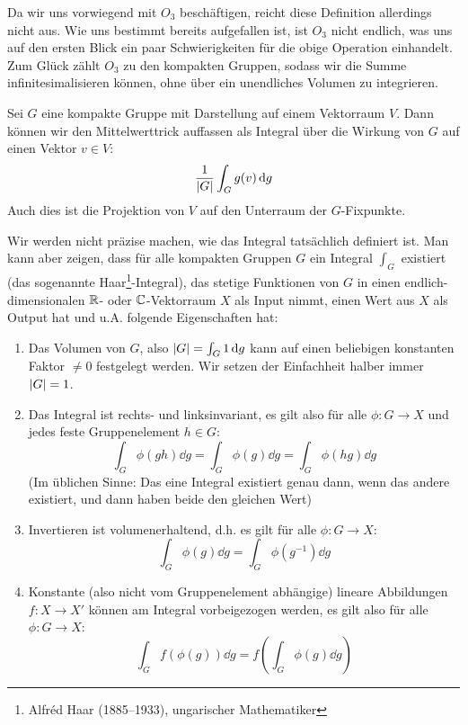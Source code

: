 \begin{remark}
Da wir uns vorwiegend mit $O_3$ beschäftigen, reicht diese Definition allerdings nicht aus. Wie uns bestimmt bereits aufgefallen ist, ist $O_3$ nicht endlich, was uns auf den ersten Blick ein paar Schwierigkeiten für die obige Operation einhandelt. Zum Glück zählt $O_3$ zu den kompakten Gruppen, sodass wir die Summe infinitesimalisieren können, ohne über ein unendliches Volumen zu integrieren.
\end{remark}

\begin{definition}
	Sei $G$ eine kompakte Gruppe mit Darstellung auf einem Vektorraum $V$. Dann können wir den Mittelwerttrick auffassen als Integral über die Wirkung von $G$ auf einen Vektor $v\in V$:
	\[
		\frac{1}{\lvert G\rvert} \int_{G} g(v) \,\textrm{d} g
	\]
	Auch dies ist die Projektion von $V$ auf den Unterraum der $G$-Fixpunkte.
	
	\medbreak
	Wir werden nicht präzise machen, wie das Integral tatsächlich definiert ist. Man kann aber zeigen, dass für alle kompakten Gruppen $G$ ein Integral $\int_G$ existiert (das sogenannte Haar\footnote{Alfréd Haar (1885--1933), ungarischer Mathematiker}-Integral), das stetige Funktionen von $G$ in einen endlich-dimensionalen $\mathbb{R}$- oder $\mathbb{C}$-Vektorraum $X$ als Input nimmt, einen Wert aus $X$ als Output hat und u.A. folgende Eigenschaften hat: 
	\begin{enumerate}
		\item Das Volumen von $G$, also $\lvert G\rvert = \int_G 1 \,\textrm{d} g$ kann auf einen beliebigen konstanten Faktor $\neq0$ festgelegt werden. Wir setzen der Einfachheit halber immer $\lvert G\rvert=1$.
		\item Das Integral ist rechts- und linksinvariant, es gilt also für alle $\phi: G\to X$ und jedes feste Gruppenelement $h\in G$:
		\[\int_{G} \phi(gh) \dd g = \int_{G} \phi(g) \dd g  = \int_{G} \phi(hg) \dd g\]
		(Im üblichen Sinne: Das eine Integral existiert genau dann, wenn das andere existiert, und dann haben beide den gleichen Wert)
		\item Invertieren ist volumenerhaltend, d.h. es gilt für alle $\phi: G\to X$:
		\[\int_G \phi(g) \dd g = \int_G \phi(g^{-1}) \dd g\]
		\item Konstante (also nicht vom Gruppenelement abhängige) lineare Abbildungen $f: X\to X'$ können am Integral vorbeigezogen werden, es gilt also für alle $\phi: G\to X$:
		\[\int_G f(\phi(g)) \dd g = f\left(\int_G \phi(g) \dd g\right)\]
	\end{enumerate}
	

\end{definition}
